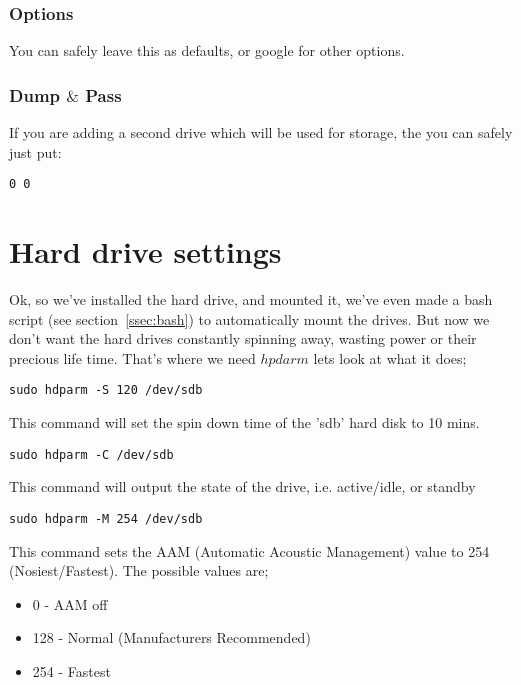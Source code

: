 \subsubsection{Options}

You can safely leave this as defaults, or google for other options.

\subsubsection{Dump $\&$ Pass}

If you are adding a second drive which will be used for storage, the you can safely just put:

\begin{verbatim}
0 0
\end{verbatim}

\section{Hard drive settings}

Ok, so we've installed the hard drive, and mounted it, we've even made a bash script (see section~\ref{ssec:bash}) to automatically mount the drives.  But now we don't want the hard drives constantly spinning away, wasting power or their precious life time.  That's where we need $hpdarm$ lets look at what it does;

\begin{lstlisting}
sudo hdparm -S 120 /dev/sdb
\end{lstlisting}

This command will set the spin down time of the 'sdb' hard disk to 10 mins.

\begin{lstlisting}
sudo hdparm -C /dev/sdb
\end{lstlisting}

This command will output the state of the drive, i.e. active/idle, or standby

\begin{lstlisting}
sudo hdparm -M 254 /dev/sdb
\end{lstlisting}

This command sets the AAM (Automatic Acoustic Management) value to 254 (Nosiest/Fastest).  The possible values are;
\begin{itemize}
\item 0 - AAM off
\item 128 - Normal (Manufacturers Recommended)
\item 254 - Fastest
\end{itemize}

